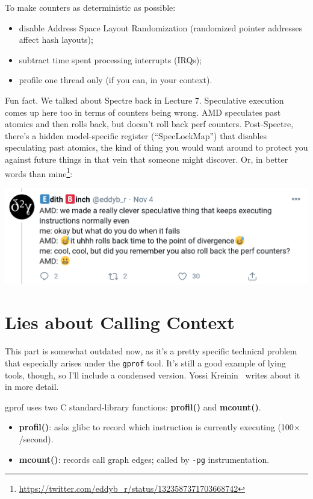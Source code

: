 \documentclass[a4paper]{report}
\begin{document}
To make counters as deterministic as possible:
\begin{itemize}[noitemsep]
\item disable Address Space Layout Randomization (randomized pointer addresses affect hash layouts);
\item subtract time spent processing interrupts (IRQs);
\item profile one thread only (if you can, in your context).
\end{itemize}
Fun fact. We talked about Spectre back in Lecture 7. Speculative execution comes up here too in terms of
counters being wrong. AMD speculates past atomics and then rolls back, but doesn't roll back perf counters.
Post-Spectre, there's a hidden model-specific register (``SpecLockMap'') that disables speculating past atomics, the kind of thing you would
want around to protect you against future things in that vein that someone might discover. Or, in better words than mine\footnote{\url{https://twitter.com/eddyb_r/status/1323587371703668742}}:

\begin{center}
\includegraphics{images/L27-eb-tweet.png}
\end{center}

\section*{Lies about Calling Context}
This part is somewhat outdated now, as it's a pretty specific technical problem that especially arises under the {\tt gprof} tool. It's still a good example of lying tools, though,
so I'll include a condensed version. Yossi Kreinin~\cite{lies} writes about it in more detail.

gprof uses two C standard-library functions: {\bf profil()} and {\bf mcount()}.

\vspace*{-1em}
\begin{itemize}[noitemsep]
\item {\bf profil()}: asks glibc to record which instruction 
  is currently executing (100$\times$/second).
\item {\bf mcount()}: records call graph edges; called by {\tt -pg} instrumentation.
\end{itemize}
\vspace*{-1em}
\end{document}
